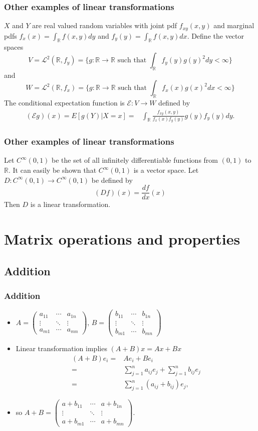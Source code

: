 \documentclass[compress]{beamer}
\def\R{\mathbb{R}}
\newcommand{\gmatrix}[1]{\begin{pmatrix} {#1}_{11} & \cdots &
    {#1}_{1n} \\ \vdots & \ddots & \vdots \\ {#1}_{m1} & \cdots &
    {#1}_{mn} \end{pmatrix}}
\theoremstyle{definition}
\begin{document}
\begin{frame}[shrink]
  \frametitle{Other examples of linear transformations}
  \begin{example}
    $X$ and $Y$ are real valued random variables with joint pdf $f_{xy}(x,y)$
    and marginal pdfs $f_x(x) = \int_\R f(x,y) dy$ and $f_y(y) =
    \int_\R f(x,y) dx$. Define the vector spaces 
    \[ 
    V = \mathcal{L}^2(\R,f_y) = \{g:
    \R \to \R \text{ such that } \int_{\R} f_y(y) g(y)^2 dy <
    \infty \} \]
    and 
    \[ 
    W = \mathcal{L}^2(\R,f_x) = \{g:
    \R \to \R \text{ such that } \int_{\R} f_x(x) g(x)^2 dx <
    \infty \} 
    \]  
    The conditional expectation function is $\mathcal{E}: V \to W$
    defined by 
    \begin{align*}
      (\mathcal{E} g)(x) = E[g(Y) | X = x] = & \int_\R
      \frac{f_{xy}(x,y)}{f_x(x) f_y(y)} g(y) f_y(y) dy.
    \end{align*}
  \end{example}
\end{frame}

\begin{frame}
  \frametitle{Other examples of linear transformations}
  \begin{example}
    Let $C^\infty(0,1)$ be the set of all infinitely differentiable
    functions from $(0,1)$ to $\R$. It can easily be shown that
    $C^\infty(0,1)$ is a vector space. Let $D:C^\infty(0,1) \rightarrow
    C^\infty(0,1)$ be defined by 
    \[ (D f) (x) = \frac{d f}{dx}(x) \]
    Then $D$ is a linear transformation.
  \end{example}
\end{frame}

\section{Matrix operations and properties}

\subsection{Addition} 
\begin{frame}
  \frametitle{Addition}
  \begin{itemize}
  \item $A = \gmatrix{a}$, $B = \gmatrix{b}$ 
  \item Linear transformation  implies $(A+B)x = Ax + Bx$
    \begin{align*}
      (A + B) e_i = & A e_i + B e_i \\
      = & \sum_{j=1}^n a_{ij} e_j + \sum_{j=1}^n b_{ij} e_j\\
      = & \sum_{j=1}^n (a_{ij} + b_{ij}) e_j,
    \end{align*}
  \item so $A + B = \gmatrix{a + b}$.
  \end{itemize}
\end{frame}
\end{document}
